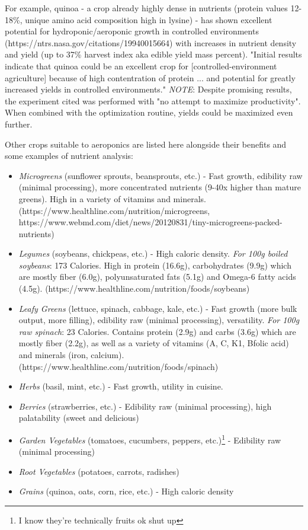 \documentclass{report}
\begin{document}
For example, quinoa - a crop already highly dense in nutrients (protein values 12-18\%, unique amino acid composition high in lysine) - has shown excellent potential for hydroponic/aeroponic growth in controlled environments (https://ntrs.nasa.gov/citations/19940015664) with increases in nutrient density and yield (up to 37\% harvest index aka edible yield mass percent). "Initial results indicate that quinoa could be an excellent crop for [controlled-environment agriculture] because of high contentration of protein ... and potential for greatly increased yields in controlled environments." \textit{NOTE}: Despite promising results, the experiment cited was performed with "no attempt to maximize productivity". When combined with the optimization routine, yields could be maximized even further.

Other crops suitable to aeroponics are listed here alongside their benefits and some examples of nutrient analysis:
\begin{itemize}
    \item \textit{Microgreens} (sunflower sprouts, beansprouts, etc.) - Fast growth, edibility raw (minimal processing), more concentrated nutrients (9-40x higher than mature greens). High in a variety of vitamins and minerals. (https://www.healthline.com/nutrition/microgreens, https://www.webmd.com/diet/news/20120831/tiny-microgreens-packed-nutrients)
    \item \textit{Legumes} (soybeans, chickpeas, etc.) - High caloric density. \textit{For 100g boiled soybeans}: 173 Calories. High in protein (16.6g), carbohydrates (9.9g) which are mostly fiber (6.0g), polyunsaturated fats (5.1g) and Omega-6 fatty acids (4.5g). (https://www.healthline.com/nutrition/foods/soybeans)
    \item \textit{Leafy Greens} (lettuce, spinach, cabbage, kale, etc.) - Fast growth (more bulk output, more filling), edibility raw (minimal processing), versatility. \textit{For 100g raw spinach}: 23 Calories. Contains protein (2.9g) and carbs (3.6g) which are mostly fiber (2.2g), as well as a variety of vitamins (A, C, K1, Bfolic acid) and minerals (iron, calcium). (https://www.healthline.com/nutrition/foods/spinach)
    \item \textit{Herbs} (basil, mint, etc.) - Fast growth, utility in cuisine.
    \item \textit{Berries} (strawberries, etc.) - Edibility raw (minimal processing), high palatability (sweet and delicious)
    \item \textit{Garden Vegetables} (tomatoes, cucumbers, peppers, etc.)\footnote{I know they're technically fruits ok shut up} - Edibility raw (minimal processing)
    \item \textit{Root Vegetables} (potatoes, carrots, radishes)
    \item \textit{Grains} (quinoa, oats, corn, rice, etc.) - High caloric density
\end{itemize}
\end{document}
